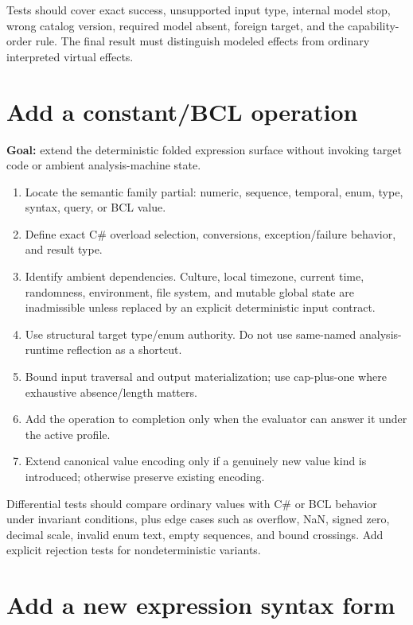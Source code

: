 \documentclass[11pt,oneside,openany]{book}
\begin{document}
Tests should cover exact success, unsupported input type, internal model stop, wrong catalog version, required model absent, foreign target, and the capability-order rule. The final result must distinguish modeled effects from ordinary interpreted virtual effects.

\section{Add a constant/BCL operation}

\begin{recipebox}
\textbf{Goal:} extend the deterministic folded expression surface without invoking target code or ambient analysis-machine state.
\end{recipebox}

\begin{enumerate}
  \item Locate the semantic family partial: numeric, sequence, temporal, enum, type, syntax, query, or BCL value.
  \item Define exact C\# overload selection, conversions, exception/failure behavior, and result type.
  \item Identify ambient dependencies. Culture, local timezone, current time, randomness, environment, file system, and mutable global state are inadmissible unless replaced by an explicit deterministic input contract.
  \item Use structural target type/enum authority. Do not use same-named analysis-runtime reflection as a shortcut.
  \item Bound input traversal and output materialization; use cap-plus-one where exhaustive absence/length matters.
  \item Add the operation to completion only when the evaluator can answer it under the active profile.
  \item Extend canonical value encoding only if a genuinely new value kind is introduced; otherwise preserve existing encoding.
\end{enumerate}

Differential tests should compare ordinary values with C\# or BCL behavior under invariant conditions, plus edge cases such as overflow, NaN, signed zero, decimal scale, invalid enum text, empty sequences, and bound crossings. Add explicit rejection tests for nondeterministic variants.

\section{Add a new expression syntax form}
\end{document}
